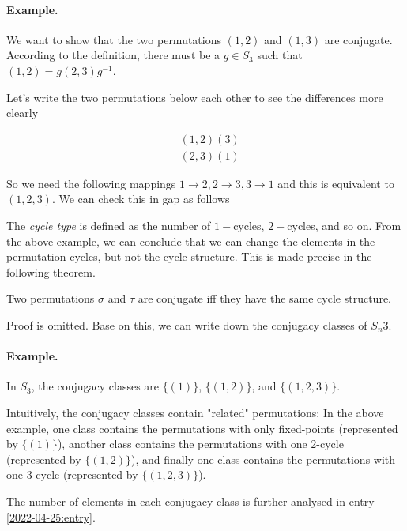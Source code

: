 \paragraph{Example.} We want to show that the two permutations $(1,2)$ and $(1,3)$ are conjugate. According to the definition, there must be a $g \in S_3$ such that $(1,2) = g(2,3)g^{-1}$. 

Let's write the two permutations below each other to see the differences more clearly

\begin{align*}
&(1,2)(3) \\
&(2,3)(1)
\end{align*}

So we need the following mappings $1 \rightarrow 2, 2 \rightarrow 3, 3 \rightarrow 1$ and this is equivalent to $(1,2,3)$. We can check this in gap as follows 

The \emph{cycle type} is defined as the number of $1-$cycles, $2-$cycles, and so on. From the above example, we can conclude that we can change the elements in the permutation cycles, but not the cycle structure. This is made precise in the following theorem.

\begin{theorem}
Two permutations $\sigma$ and $\tau$ are conjugate iff they have the same cycle structure.
\end{theorem}

Proof is omitted. Base on this, we can write down the conjugacy classes of $S_n3$.

\paragraph{Example.} In $S_3$, the conjugacy classes are $\{(1)\}$, $\{(1,2)\}$, and $\{(1,2,3)\}$.

Intuitively, the conjugacy classes contain "related" permutations: In the above example, one class contains the permutations with only fixed-points (represented by $\{(1)\}$), another class contains the permutations with one 2-cycle (represented by $\{(1,2)\}$), and finally one class contains the permutations with one 3-cycle (represented by $\{(1,2,3)\}$).

The number of elements in each conjugacy class is further analysed in entry \ref{2022-04-25:entry}.

